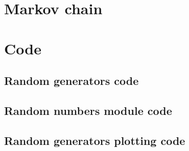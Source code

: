 \documentclass[twocolumn]{myarticle}
\begin{document}
\section{Markov chain}
\label{sec:markov_chain}



\onecolumn

\section{Code}
\label{sec:code}

\subsection{Random generators code}
\label{subsec:random_generators_code}


\vspace{10pt}

\subsection{Random numbers module code}
\label{subsec:random_numbers_module_code}


\vspace{10pt}

\subsection{Random generators plotting code}
\label{subsec:random_generators_plotting_code}


\vspace{10pt}
\end{document}
